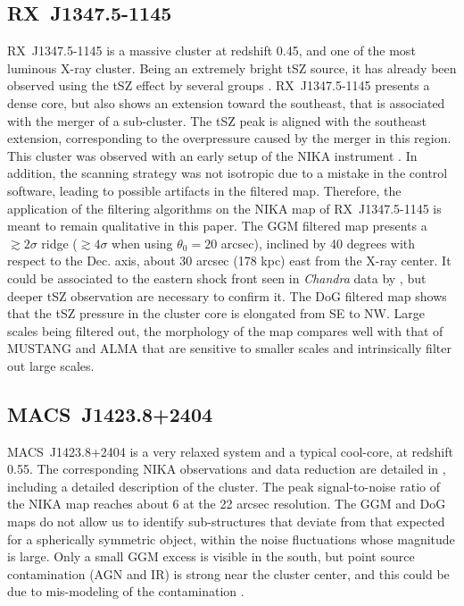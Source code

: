 \documentclass[twocolumn,traditabstract]{aa}
\begin{document}
\subsection{RX~J1347.5-1145}\label{sec:RXJ1347.5-1145}
\mbox{RX~J1347.5-1145} is a massive cluster at redshift 0.45, and one of the most luminous X-ray cluster. Being an extremely bright tSZ source, it has already been observed using the tSZ effect by several groups \citep[e.g.][]{Pointecouteau1999,Komatsu1999,Mason2010,Plagge2012,Adam2014,Sayers2016,Kitayama2016}. \mbox{RX~J1347.5-1145} presents a dense core, but also shows an extension toward the southeast, that is associated with the merger of a sub-cluster. The tSZ peak is aligned with the southeast extension, corresponding to the overpressure caused by the merger in this region. This cluster was observed with an early setup of the NIKA instrument \citep[bandpass, sensitivity, calibration procedure, see][for more details]{Adam2014}. In addition, the scanning strategy was not isotropic due to a mistake in the control software, leading to possible artifacts in the filtered map. Therefore, the application of the filtering algorithms on the NIKA map of \mbox{RX~J1347.5-1145} is meant to remain qualitative in this paper. The GGM filtered map presents a $\gtrsim 2 \sigma$ ridge ($\gtrsim 4 \sigma$ when using $\theta_0 = 20$ arcsec), inclined by 40 degrees with respect to the Dec. axis, about 30 arcsec (178 kpc) east from the X-ray center. It could be associated to the eastern shock front seen in \textit{Chandra} data by \cite{Kreisch2016}, but deeper tSZ observation are necessary to confirm it. The DoG filtered map shows that the tSZ pressure in the cluster core is elongated from SE to NW. Large scales being filtered out, the morphology of the map compares well with that of MUSTANG \citep{Mason2010} and ALMA \citep{Kitayama2016} that are sensitive to smaller scales and intrinsically filter out large scales.

\subsection{MACS~J1423.8+2404}
\mbox{MACS~J1423.8+2404} is a very relaxed system and a typical cool-core, at redshift 0.55. The corresponding NIKA observations and data reduction are detailed in \cite{Adam2016a}, including a detailed description of the cluster. The peak signal-to-noise ratio of the NIKA map reaches about 6 at the 22 arcsec resolution. The GGM and DoG maps do not allow us to identify sub-structures that deviate from that expected for a spherically symmetric object, within the noise fluctuations whose magnitude is large. Only a small GGM excess is visible in the south, but point source contamination (AGN and IR) is strong near the cluster center, and this could be due to mis-modeling of the contamination \citep[see][and the discussion of Section \ref{sec:Point_sources_residuals}]{Adam2016a}.
\end{document}
